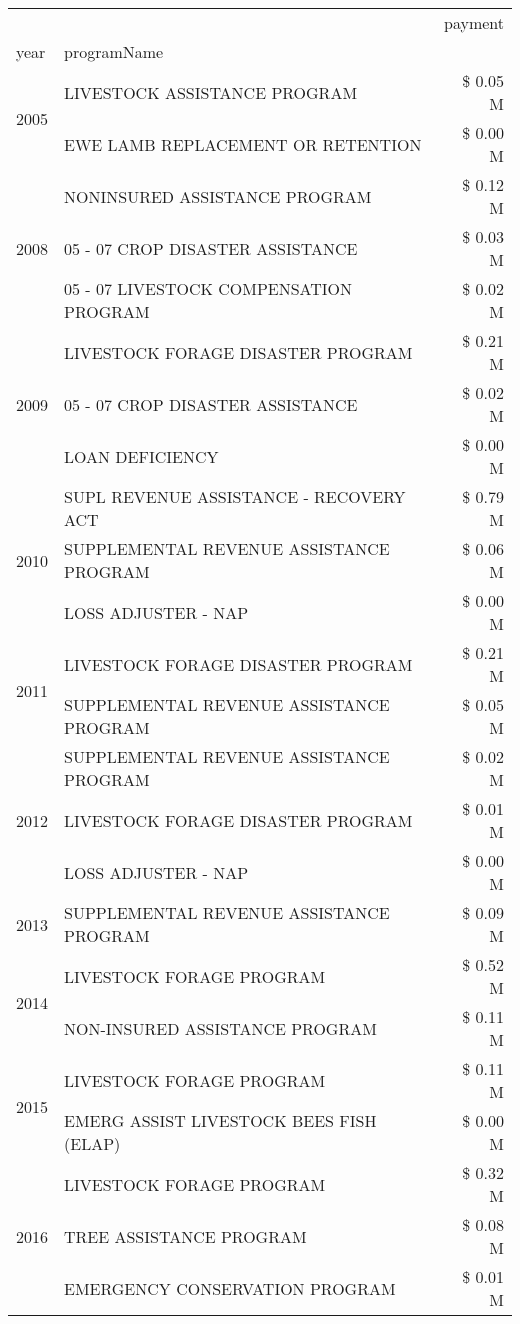 \begin{tabular}{llr}
\toprule
 &  & payment \\
year & programName &  \\
\midrule
\multirow[t]{2}{*}{2005} & LIVESTOCK ASSISTANCE PROGRAM & \$ 0.05 M \\
 & EWE LAMB REPLACEMENT OR RETENTION & \$ 0.00 M \\
\cline{1-3}
\multirow[t]{3}{*}{2008} & NONINSURED ASSISTANCE PROGRAM & \$ 0.12 M \\
 & 05 - 07 CROP DISASTER ASSISTANCE & \$ 0.03 M \\
 & 05 - 07 LIVESTOCK COMPENSATION PROGRAM & \$ 0.02 M \\
\cline{1-3}
\multirow[t]{3}{*}{2009} & LIVESTOCK FORAGE DISASTER  PROGRAM & \$ 0.21 M \\
 & 05 - 07 CROP DISASTER ASSISTANCE & \$ 0.02 M \\
 & LOAN DEFICIENCY & \$ 0.00 M \\
\cline{1-3}
\multirow[t]{3}{*}{2010} & SUPL REVENUE ASSISTANCE - RECOVERY ACT & \$ 0.79 M \\
 & SUPPLEMENTAL REVENUE ASSISTANCE PROGRAM & \$ 0.06 M \\
 & LOSS ADJUSTER - NAP & \$ 0.00 M \\
\cline{1-3}
\multirow[t]{2}{*}{2011} & LIVESTOCK FORAGE DISASTER PROGRAM & \$ 0.21 M \\
 & SUPPLEMENTAL REVENUE ASSISTANCE PROGRAM & \$ 0.05 M \\
\cline{1-3}
\multirow[t]{3}{*}{2012} & SUPPLEMENTAL REVENUE ASSISTANCE PROGRAM & \$ 0.02 M \\
 & LIVESTOCK FORAGE DISASTER PROGRAM & \$ 0.01 M \\
 & LOSS ADJUSTER - NAP & \$ 0.00 M \\
\cline{1-3}
2013 & SUPPLEMENTAL REVENUE ASSISTANCE PROGRAM & \$ 0.09 M \\
\cline{1-3}
\multirow[t]{2}{*}{2014} & LIVESTOCK FORAGE PROGRAM & \$ 0.52 M \\
 & NON-INSURED ASSISTANCE PROGRAM & \$ 0.11 M \\
\cline{1-3}
\multirow[t]{2}{*}{2015} & LIVESTOCK FORAGE PROGRAM & \$ 0.11 M \\
 & EMERG ASSIST LIVESTOCK BEES FISH (ELAP) & \$ 0.00 M \\
\cline{1-3}
\multirow[t]{3}{*}{2016} & LIVESTOCK FORAGE PROGRAM & \$ 0.32 M \\
 & TREE ASSISTANCE PROGRAM & \$ 0.08 M \\
 & EMERGENCY CONSERVATION PROGRAM & \$ 0.01 M \\

\end{tabular}
